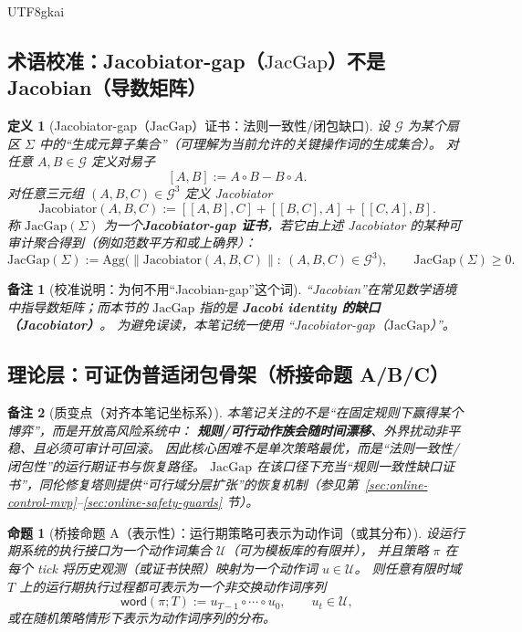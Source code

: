 \documentclass[12pt]{article}
\newtheorem{definition}{定义}[section]
\newtheorem{proposition}{命题}[section]
\newtheorem{remark}{备注}[section]
\newcommand{\JacGap}{\ensuremath{\mathrm{JacGap}}} %
\begin{document}
\begin{CJK*}{UTF8}{gkai}
\subsection{术语校准：Jacobiator-gap（\JacGap）不是 Jacobian（导数矩阵）}
\label{sec:jacgap-terminology}

\begin{definition}[Jacobiator-gap（\JacGap）证书：法则一致性/闭包缺口]
\label{def:jacobiator-gap-certificate}
设 $\mathcal{G}$ 为某个扇区 $\Sigma$ 中的“生成元算子集合”（可理解为当前允许的关键操作词的生成集合）。
对任意 $A,B\in\mathcal{G}$ 定义对易子
\[
  [A,B]:=A\circ B - B\circ A.
\]
对任意三元组 $(A,B,C)\in\mathcal{G}^3$ 定义 Jacobiator
\[
  \mathrm{Jacobiator}(A,B,C)
  :=
  [[A,B],C] + [[B,C],A] + [[C,A],B].
\]
称 $\JacGap(\Sigma)$ 为一个\textbf{Jacobiator-gap 证书}，若它由上述 Jacobiator 的某种可审计聚合得到（例如范数平方和或上确界）：
\[
  \JacGap(\Sigma)
  :=
  \mathrm{Agg}\bigl(\|\mathrm{Jacobiator}(A,B,C)\|:\ (A,B,C)\in\mathcal{G}^3\bigr),
  \qquad
  \JacGap(\Sigma)\ge 0.
\]
\end{definition}

\begin{remark}[校准说明：为何不用“Jacobian-gap”这个词]
“Jacobian”在常见数学语境中指导数矩阵；而本节的 \JacGap{} 指的是 \textbf{Jacobi identity 的缺口（Jacobiator）}。
为避免误读，本笔记统一使用 “Jacobiator-gap（\JacGap）”。
\end{remark}

\subsection{理论层：可证伪普适闭包骨架（桥接命题 A/B/C）}
\label{sec:jacgap-bridge-abc}

\begin{remark}[质变点（对齐本笔记坐标系）]
本笔记关注的不是“在固定规则下赢得某个博弈”，而是开放高风险系统中：
\textbf{规则/可行动作族会随时间漂移}、外界扰动非平稳、且必须可审计可回滚。
因此核心困难不是单次策略最优，而是“法则一致性/闭包性”的运行期证书与恢复路径。
\JacGap{} 在该口径下充当“规则一致性缺口证书”，同伦修复塔则提供“可行域分层扩张”的恢复机制（参见第~\ref{sec:online-control-mvp}--\ref{sec:online-safety-guards} 节）。
\end{remark}

\begin{proposition}[桥接命题 A（表示性）：运行期策略可表示为动作词（或其分布）]
\label{prop:bridge-a-representation}
设运行期系统的执行接口为一个动作词集合 $\mathcal{U}$（可为模板库的有限并），
并且策略 $\pi$ 在每个 tick 将历史观测（或证书快照）映射为一个动作词 $u\in\mathcal{U}$。
则任意有限时域 $T$ 上的运行期执行过程都可表示为一个非交换动作词序列
\[
  \mathsf{word}(\pi;T) := u_{T-1}\circ\cdots\circ u_0,
  \qquad u_t\in\mathcal{U},
\]
或在随机策略情形下表示为动作词序列的分布。
\end{proposition}


\end{CJK*}
\end{document}
